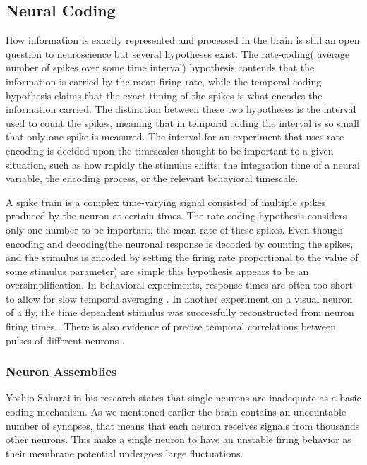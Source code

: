 \documentclass[12pt]{report}
\begin{document}
\subsection{Neural Coding}
How information is exactly represented and processed in the brain is still an open question to neuroscience but several hypotheses exist. The rate-coding( average number of spikes over some time interval) hypothesis \cite{ Salzman1992} \cite{Tovee1993} contends that the information is carried by the mean firing rate, while the temporal-coding   hypothesis \cite{Bair1996} \cite{buracas1998} \cite{Rucci2018} claims that the exact timing of the spikes is what encodes the information carried.
The distinction between these two hypotheses is the interval used to count the spikes, meaning that in temporal coding the interval is so small that only one spike is measured. The interval for an experiment that uses rate encoding is decided upon the timescales thought to be important to a given situation, such as how rapidly the stimulus shifts, the integration time of a neural variable, the encoding process, or the relevant behavioral timescale. 


A spike train is a complex time-varying signal consisted of multiple spikes produced by the neuron at certain times. The rate-coding hypothesis considers only one number to be important, the mean rate of these spikes. Even though encoding and decoding(the neuronal response is decoded by counting the spikes, and the stimulus is encoded by setting the firing rate proportional to the value of some stimulus parameter) are simple this hypothesis appears to be an oversimplification. In behavioral experiments, response times are often too short to allow for slow temporal averaging \cite{thorpe1996}. In another experiment on a visual neuron of a fly, the time dependent stimulus was successfully reconstructed from neuron firing times \cite{Bialek1991}. There is also evidence of precise temporal correlations between pulses of different neurons \cite{Lestienne1996} .
\subsubsection{Neuron Assemblies}
Yoshio Sakurai in his research \cite{sakurai1999} states that single neurons are inadequate as a basic coding mechanism. As we mentioned earlier the brain contains an uncountable number of synapses, that means that each neuron receives signals from thousands other neurons. This make a single neuron to have an unstable firing behavior as their membrane potential undergoes large fluctuations. 
\end{document}
